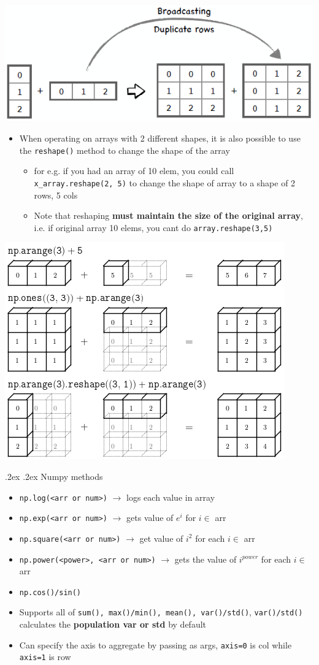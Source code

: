 \documentclass[10pt,landscape,a4paper]{article}
\makeatletter
\renewcommand{\subsection}{\@startsection{subsection}{1}{0mm}%
	{.2ex}%
	{.2ex}%
	{\sffamily\bfseries}}
\makeatother
\begin{document}
\begin{multicols*}{4}
\begin{itemize}
\begin{itemize}
			\end{itemize}
		\end{itemize}
		\begin{center}
			\includegraphics[width=0.4\columnwidth]{broadcasting}
		\end{center}
		\begin{itemize}
			\item When operating on arrays with 2 different shapes, it is also possible to use the \texttt{reshape()} method to change the shape of the array
			\begin{itemize}
				\item for e.g. if you had an array of 10 elem, you could call \texttt{x\_array.reshape(2, 5)} to change the shape of array to a shape of 2 rows, 5 cols
				\item Note that reshaping \textbf{must maintain the size of the original array}, i.e. if original array 10 elems, you cant do \texttt{array.reshape(3,5)}
			\end{itemize}
		\end{itemize}
		\begin{center}
			\includegraphics[width=0.4\columnwidth]{reshape}
		\end{center}
		\subsection{Numpy methods}
		\begin{itemize}
			\item \texttt{np.log(<arr or num>)} $\rightarrow$ logs each value in array
			\item \texttt{np.exp(<arr or num>)} $\rightarrow$ gets value of $e^i$ for $i\in $ arr
			\item \texttt{np.square(<arr or num>)} $\rightarrow$ get value of $i^2$ for each $i\in$ arr
			\item \texttt{np.power(<power>, <arr or num>)} $\rightarrow$ gets the value of $i^{power}$ for each $i \in$ arr
			\item \texttt{np.cos()/sin()}
			\item Supports all of \texttt{sum(), max()/min(), mean(), var()/std()}, \texttt{var()/std()} calculates the \textbf{population var or std }by default
			\item Can specify the axis to aggregate by passing as args, \texttt{axis=0} is col while \texttt{axis=1} is row
		\end{itemize}

\end{multicols*}
\end{document}
